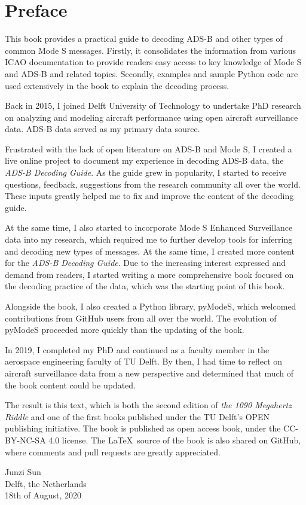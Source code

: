 \chapter*{Preface}

This book provides a practical guide to decoding ADS-B and other types of common Mode S messages. Firstly, it consolidates the information from various ICAO documentation to provide readers easy access to key knowledge of Mode S and ADS-B and related topics. Secondly, examples and sample Python code are used extensively in the book to explain the decoding process.

Back in 2015, I joined Delft University of Technology to undertake PhD research on analyzing and modeling aircraft performance using open aircraft surveillance data. ADS-B data served as my primary data source.

Frustrated with the lack of open literature on ADS-B and Mode S, I created a live online project to document my experience in decoding ADS-B data, the \emph{ADS-B Decoding Guide}. As the guide grew in popularity, I started to receive questions, feedback, suggestions from the research community all over the world. These inputs greatly helped me to fix and improve the content of the decoding guide.

At the same time, I also started to incorporate Mode S Enhanced Surveillance data into my research, which required me to further develop tools for inferring and decoding new types of messages. At the same time, I created more content for the \emph{ADS-B Decoding Guide}. Due to the increasing interest expressed and demand from readers, I started writing a more comprehensive book focused on the decoding practice of the data, which was the starting point of this book.

Alongside the book, I also created a Python library, pyModeS, which welcomed contributions from GitHub users from all over the world. The evolution of pyModeS proceeded more quickly than the updating of the book. 

In 2019, I completed my PhD and continued as a faculty member in the aerospace engineering faculty of TU Delft. By then, I had time to reflect on aircraft surveillance data from a new perspective and determined that much of the book content could be updated.

The result is this text, which is both the second edition of \emph{the 1090 Megahertz Riddle} and one of the first books published under the TU Delft's OPEN publishing initiative. The book is published as open access book, under the CC-BY-NC-SA 4.0 license. The \LaTeX~source of the book is also shared on GitHub, where comments and pull requests are greatly appreciated.

\vspace{1cm}

\begin{flushright}
  Junzi Sun \\
  Delft, the Netherlands \\
  18th of August, 2020
\end{flushright}
